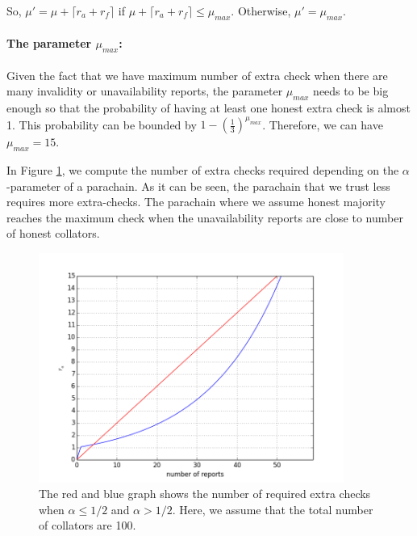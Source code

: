 So, $\mu' = \mu + \lceil r_a + r_f \rceil$ if $\mu + \lceil r_a + r_f \rceil \leq \mu_{max}$. Otherwise, $\mu' = \mu_{max}$.


\paragraph{The parameter $\mu_{max}$:} Given the fact that we have maximum number of extra check when there are many invalidity or unavailability  reports, the parameter $\mu_{max}$ needs to be big enough so that the probability of having at least one honest extra check is almost 1.
This probability can be bounded by $1-(\frac{1}{3})^{\mu_{max}}$. Therefore, we can have $\mu_{max} = 15$.

In Figure \ref{fig:ra}, we compute the number of extra checks required depending on the $\alpha$-parameter of a parachain. As it can be seen, the parachain that we trust less requires more extra-checks. The parachain where we assume honest majority reaches the maximum check when the unavailability reports are close to number of honest collators.  


\begin{figure}[h]\centering
	  \includegraphics[width=10cm]{images/ra.png}
	  \caption{The red and blue graph shows the number of required extra checks when $\alpha \leq 1/2$ and $\alpha > 1/2$. Here, we assume that the total number of collators are 100.}
	  \label{fig:ra}
\end{figure}

